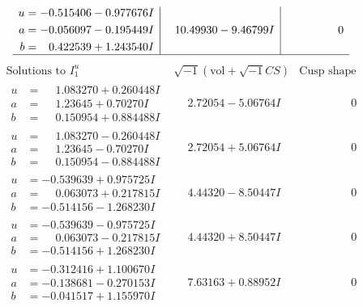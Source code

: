 \documentclass[1p]{elsarticle_modified}
\theoremstyle{definition}
\newcommand{\I}{\sqrt{-1}}
\begin{document}
$$\begin{array}{c|c|c}
\begin{aligned}
u &= -0.515406 - 0.977676 I \\
a &= -0.056097 - 0.195449 I \\
b &= \phantom{-}0.422539 + 1.243540 I\end{aligned}
 & \phantom{-}10.49930 - 9.46799 I & \phantom{-0.000000 } 0\\
 \hline 
 \end{array}$$\newpage$$\begin{array}{c|c|c}  
\text{Solutions to }I^u_{1}& \I (\text{vol} + \sqrt{-1}CS) & \text{Cusp shape}\\
 \hline 
\begin{aligned}
u &= \phantom{-}1.083270 + 0.260448 I \\
a &= \phantom{-}1.23645 + 0.70270 I \\
b &= \phantom{-}0.150954 + 0.884488 I\end{aligned}
 & \phantom{-}2.72054 - 5.06764 I & \phantom{-0.000000 } 0 \\ \hline\begin{aligned}
u &= \phantom{-}1.083270 - 0.260448 I \\
a &= \phantom{-}1.23645 - 0.70270 I \\
b &= \phantom{-}0.150954 - 0.884488 I\end{aligned}
 & \phantom{-}2.72054 + 5.06764 I & \phantom{-0.000000 } 0 \\ \hline\begin{aligned}
u &= -0.539639 + 0.975725 I \\
a &= \phantom{-}0.063073 + 0.217815 I \\
b &= -0.514156 - 1.268230 I\end{aligned}
 & \phantom{-}4.44320 - 8.50447 I & \phantom{-0.000000 } 0 \\ \hline\begin{aligned}
u &= -0.539639 - 0.975725 I \\
a &= \phantom{-}0.063073 - 0.217815 I \\
b &= -0.514156 + 1.268230 I\end{aligned}
 & \phantom{-}4.44320 + 8.50447 I & \phantom{-0.000000 } 0 \\ \hline\begin{aligned}
u &= -0.312416 + 1.100670 I \\
a &= -0.138681 - 0.270153 I \\
b &= -0.041517 + 1.155970 I\end{aligned}
 & \phantom{-}7.63163 + 0.88952 I & \phantom{-0.000000 } 0 \\ \hline\begin{aligned}

\end{aligned}
\end{array}$$
\end{document}
